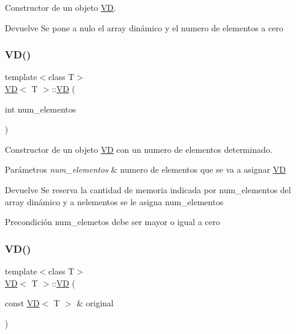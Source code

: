 Constructor de un objeto \hyperlink{classVD}{VD}. 

\begin{DoxyReturn}{Devuelve}
Se pone a nulo el array dinámico y el numero de elementos a cero 
\end{DoxyReturn}
\mbox{\label{classVD_ae0b07f71bdbb515e4cb3cb397a8b2f8c}} 
\subsubsection{\texorpdfstring{V\+D()}{VD()}\hspace{0.1cm}{\footnotesize\ttfamily [2/3]}}
{\footnotesize\ttfamily template$<$class T$>$ \\
\hyperlink{classVD}{VD}$<$ T $>$\+::\hyperlink{classVD}{VD} (\begin{DoxyParamCaption}\item[{int}]{num\+\_\+elementos }\end{DoxyParamCaption})\hspace{0.3cm}{\ttfamily [inline]}}



Constructor de un objeto \hyperlink{classVD}{VD} con un numero de elementos determinado. 


\begin{DoxyParams}{Parámetros}
{\em num\+\_\+elementos} & numero de elementos que se va a asignar \hyperlink{classVD}{VD} \\
\hline
\end{DoxyParams}
\begin{DoxyReturn}{Devuelve}
Se reserva la cantidad de memoria indicada por num\+\_\+elementos del array dinámico y a nelementos se le asigna num\+\_\+elementos 
\end{DoxyReturn}
\begin{DoxyPrecond}{Precondición}
num\+\_\+elemetos debe ser mayor o igual a cero 
\end{DoxyPrecond}
\mbox{\label{classVD_ad1b6a98793128fe8fa7adca6e5fddb0f}} 
\subsubsection{\texorpdfstring{V\+D()}{VD()}\hspace{0.1cm}{\footnotesize\ttfamily [3/3]}}
{\footnotesize\ttfamily template$<$class T$>$ \\
\hyperlink{classVD}{VD}$<$ T $>$\+::\hyperlink{classVD}{VD} (\begin{DoxyParamCaption}\item[{const \hyperlink{classVD}{VD}$<$ T $>$ \&}]{original }\end{DoxyParamCaption})\hspace{0.3cm}{\ttfamily [inline]}}




